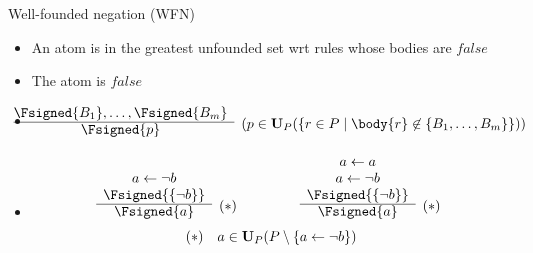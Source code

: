 \begin{frame}{Well-founded negation (WFN)}
\begin{itemize}
\item {} An atom is in the greatest unfounded set wrt rules whose bodies are $\mathit{false}$
\item {} The atom is $\mathit{false}$
\item {}
\[
\hspace{-5mm}
\begin{array}{@{}cl}
\Fsigned{B_1},\dots,\Fsigned{B_m} &
\raisebox{-8pt}[0pt][0pt]{($p \in \mathbf{U}_P(\{r \in P \mid \body{r} \not\in \{B_1,\dots,B_m\}\})$)}
\\\cline{1-1}
\Fsigned{p}
\end{array}
\]
\item<2-> 
\[
\begin{array}[b]{cl}
a \leftarrow \neg b \\
\Fsigned{\{\neg b\}} &
\raisebox{-8pt}[0pt][0pt]{$(*)$}
\\\cline{1-1}
\Fsigned{a}
\end{array}
\qquad\qquad
\begin{array}[b]{cl}
a \leftarrow a \\
a \leftarrow \neg b \\
\Fsigned{\{\neg b\}} &
\raisebox{-8pt}[0pt][0pt]{$(*)$}
\\\cline{1-1}
\Fsigned{a}
\end{array}
\hfill
\]
\[
\hfill
(*)\quad a \in \mathbf{U}_P(P \setminus \{a \leftarrow \neg b\})
\hfill\hfill
\]
\end{itemize}
\end{frame}
